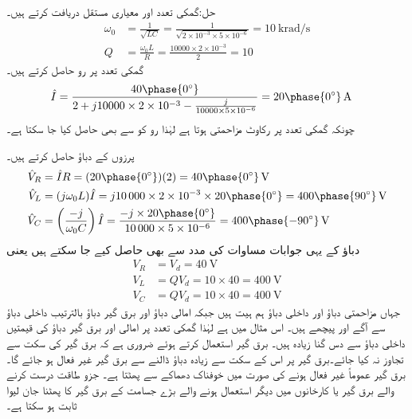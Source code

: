 حل:گمکی تعدد اور معیاری مستقل دریافت کرتے ہیں۔
\begin{align*}
\omega_0&=\frac{1}{\sqrt{LC}}=\frac{1}{\sqrt{2\times 10^{-3}\times 5\times 10^{-6}}}=\SI{10}{\kilo\radian\per\second}\\
Q&=\frac{\omega_0 L}{R}=\frac{\num{10000}\times 2\times 10^{-3}}{2}=10
\end{align*}
گمکی تعدد پر رو حاصل کرتے ہیں۔
\begin{align*}
\hat{I}&=\frac{40\phase{0^{\circ}}}{2+j10000\times 2\times 10^{-3}-\frac{j}{10000\times 5 \times 10^{-6}}}=20\phase{0^{\circ}}\,\si{\ampere}
\end{align*}
چونکہ گمکی تعدد پر رکاوٹ مزاحمتی ہوتا ہے لہٰذا رو کو  سے بھی حاصل کیا جا سکتا ہے۔

پرزوں کے دباؤ حاصل کرتے ہیں۔
\begin{align*}
\hat{V}_R&=\hat{I} R=(20\phase{0^{\circ}})(2)=40\phase{0^{\circ}}\,\si{\volt}\\
\hat{V}_L&=(j\omega_0 L) \hat{I}=j \num{10000}\times 2\times 10^{-3} \times 20\phase{0^{\circ}}=400\phase{90^{\circ}}\,\si{\volt}\\
\hat{V}_C&=\left(\frac{-j}{\omega_0 C}\right) \hat{I}=\frac{-j\times 20\phase{0^{\circ}}}{\num{10000}\times 5\times 10^{-6}}=400\phase{-90^{\circ}}\,\si{\volt}
\end{align*}
دباؤ کے یہی جوابات مساوات  کی مدد سے بھی حاصل کیے جا سکتے ہیں یعنی
\begin{align*}
V_R&=V_d=\SI{40}{\volt}\\
V_L&=Q V_d=10\times 40=\SI{400}{\volt}\\
V_C&=Q V_d=10\times 40=\SI{400}{\volt}
\end{align*}
جہاں مزاحمتی دباؤ اور داخلی دباؤ ہم ہیت ہیں جبکہ امالی دباؤ اور برق گیر دباؤ بالترتیب داخلی دباؤ سے  آگے اور پیچھے ہیں۔ اس مثال میں  ہے لہٰذا گمکی تعدد پر امالی اور برق گیر دباؤ کی قیمتیں داخلی دباؤ سے دس گنا زیادہ ہیں۔ 
برق گیر استعمال کرتے ہوئے ضروری ہے کہ برق گیر کی سکت سے تجاوز نہ کیا جائے۔برق گیر پر اس کے سکت سے زیادہ دباؤ ڈالنے سے برق گیر غیر فعال ہو جائے گا۔برق گیر عموماً غیر فعال ہونے کی صورت میں خوفناک دھماکے سے پھٹتا ہے۔ جزو طاقت درست کرنے والے برق گیر یا کارخانوں میں دیگر استعمال ہونے والے بڑے جسامت کے برق گیر کا پھٹنا جان لیوا ثابت ہو سکتا ہے۔

